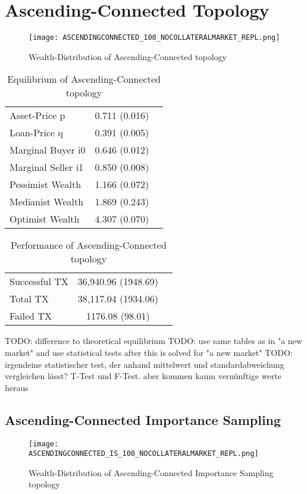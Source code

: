 \documentclass[Bachelorarbeit.tex]{subfiles}
\begin{document}
\section{Ascending-Connected Topology} 

\begin{figure}[H]
	\centering
  \texttt{[image: ASCENDINGCONNECTED\_100\_NOCOLLATERALMARKET\_REPL.png]}
	\caption{Wealth-Distribution of Ascending-Connected topology}
	\label{fig:wealth_ASCENDINGCONNECTED_100_NOCOLLATERALMARKET_REPL}
\end{figure}

\begin{table}[H]
	\caption{Equilibrium of Ascending-Connected topology}
	\centering
	\begin{tabular} { l c r }
		\hline
		Asset-Price p & 0.711 (0.016) \\
		Loan-Price q & 0.391 (0.005) \\
		Marginal Buyer i0 & 0.646 (0.012) \\
		Marginal Seller i1 & 0.850 (0.008) \\
		\hline
		Pessimist Wealth & 1.166 (0.072) \\
		Medianist Wealth & 1.869 (0.243) \\
		Optimist Wealth & 4.307 (0.070) \\
		\hline
	\end{tabular}
	\label{tab:ascendingconnected_equilibrium_100Agents_05Bond}
\end{table} 

\begin{table}[H]
	\caption{Performance of Ascending-Connected topology}
	\centering
	\begin{tabular} { l c r }
		\hline
		Successful TX & 36,940.96 (1948.69) \\
		Total TX & 38,117.04 (1934.06) \\
		Failed TX & 1176.08 (98.01) \\
		\hline
	\end{tabular}
\end{table}

TODO: difference to theoretical equilibrium
TODO: use same tables as in "a new market" and use statistical tests after this is solved for "a new market"
TODO: irgendeine statistischer test, der anhand mittelwert und standardabweichung vergleichen lässt?
T-Test und F-Test.
aber kommen kaum vernünftige werte heraus

\subsection{Ascending-Connected Importance Sampling}
\begin{figure}[H]
	\centering
  \texttt{[image: ASCENDINGCONNECTED\_IS\_100\_NOCOLLATERALMARKET\_REPL.png]}
	\caption{Wealth-Distribution of Ascending-Connected Importance Sampling topology}
	\label{fig:wealth_ASCENDINGCONNECTED_IS_100_NOCOLLATERALMARKET_REPL}
\end{figure}
\end{document}
